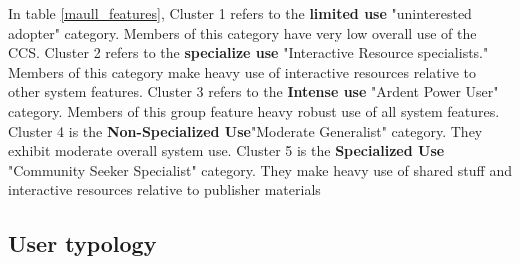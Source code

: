 \documentclass{acm_proc_article-sp}
\begin{document}
In table \ref{maull_features}, Cluster 1 refers to the \textbf{limited use} "uninterested adopter" category. Members of this category have very low overall use of the CCS. Cluster 2 refers to the \textbf{specialize use} "Interactive Resource specialists." Members of this category make heavy use of interactive resources relative to other system features. Cluster 3 refers to the \textbf{Intense use} "Ardent Power User" category. Members of this group feature heavy robust use of all system features. Cluster 4 is the \textbf{Non-Specialized Use}"Moderate Generalist" category. They exhibit moderate overall system use. Cluster 5 is the \textbf{Specialized Use} "Community Seeker Specialist" category. They make heavy use of shared stuff and interactive resources relative to publisher materials

\subsection{User typology}
\end{document}
